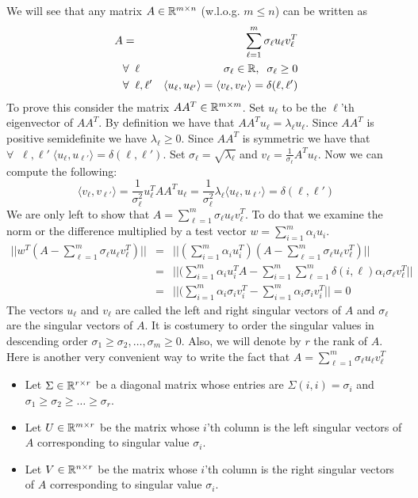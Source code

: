\documentclass{article}
\begin{document}

\noindent We will see that any matrix $A \in {\mathbb{R}}^{m \times n}$ (w.l.o.g. $m \le n$) can be written as 
\begin{eqnarray}
A &=& \sum_{\ell=1}^{m} \sigma_{\ell} u_{\ell} v_{\ell}^{T}\\
&\forall \;\; \ell& \sigma_\ell \in {\mathbb{R}},  \;\; \sigma_\ell \ge 0\\
&\forall \;\; \ell, \ell'&  \langle u_{\ell}, u_{\ell'} \rangle=  \langle v_{\ell}, v_{\ell'} \rangle = \delta(\ell,\ell')
\end{eqnarray}
%
To prove this consider the matrix $AA^{T} \in {\mathbb{R}}^{m\times m}$.
Set $u_\ell$ to be the $\ell$'th eigenvector of $AA^{T}$.
By definition we have that $AA^{T}u_\ell = \lambda_\ell u_\ell$.
Since $AA^{T}$ is positive semidefinite we have $\lambda_\ell \ge 0$.
Since $AA^{T}$ is symmetric we have that $\forall \;\; \ell, \ell' \;  \langle u_{\ell}, u_{\ell'} \rangle = \delta(\ell,\ell')$.
Set $\sigma_\ell = \sqrt{\lambda_\ell}$ and $v_\ell = \frac{1}{\sigma_\ell}A^{T}u_{\ell}$.
Now we can compute the following:
\[
\langle v_{\ell}, v_{\ell'} \rangle =  \frac{1}{\sigma^{2}_\ell}u_{\ell}^{T}AA^{T}u_{\ell} =   \frac{1}{\sigma_{\ell}^{2}}\lambda_\ell  \langle u_{\ell}, u_{\ell'} \rangle = \delta(\ell,\ell')
\]
%
We are only left to show that $A = \sum_{\ell=1}^{m} \sigma_{\ell} u_{\ell} v_{\ell}^{T}$.
To do that we examine the norm or the difference multiplied by a test vector $w = \sum_{i=1}^{m} \alpha_i u_i$.
\begin{eqnarray*}
|| w^{T}(A - \sum_{\ell=1}^{m} \sigma_{\ell} u_{\ell} v_{\ell}^{T})|| &=& || (\sum_{i=1}^{m}\alpha_i u^{T}_{i})(A - \sum_{\ell=1}^{m} \sigma_{\ell} u_{\ell} v_{\ell}^{T})|| \\
&=& || (\sum_{i=1}^{m}\alpha_{i} u^{T}_{i}A - \sum_{i=1}^{m}\sum_{\ell=1}^{m} \delta(i,\ell) \alpha_i \sigma_{\ell} v_{\ell}^{T}|| \\
&=& || (\sum_{i=1}^{m}\alpha_{i} \sigma_{i} v^{T}_{i} - \sum_{i=1}^{m} \alpha_i \sigma_{i} v_{i}^{T}|| = 0
\end{eqnarray*}
%
The vectors $u_\ell$ and $v_{\ell}$ are called the left and right singular vectors of $A$ and $\sigma_\ell$ are the singular vectors of $A$.
It is costumery to order the singular values in descending order $\sigma_1 \ge \sigma_2, \ldots , \sigma_m \ge 0$.
Also, we will denote by $r$ the rank of $A$. 
Here is another very convenient way to write the fact that $A = \sum_{\ell=1}^{m} \sigma_{\ell} u_{\ell} v_{\ell}^{T}$
\begin{itemize}
\item Let $\Sigma \in {\mathbb{R}}^{r \times r}$ be a diagonal matrix whose entries are $\Sigma(i,i) = \sigma_i$ and $\sigma_1 \ge \sigma_2 \ge \ldots \ge \sigma_r$.
\item Let $U \in {\mathbb{R}}^{m \times r}$ be the matrix whose $i$'th column is the left singular vectors of $A$ corresponding to singular value $\sigma_i$.
\item Let $V \in {\mathbb{R}}^{n \times r}$ be the matrix whose $i$'th column is the right singular vectors of $A$ corresponding to singular value $\sigma_i$.
\end{itemize}
\end{document}
